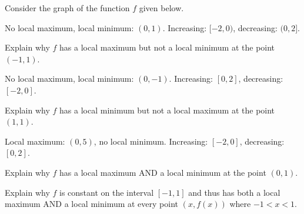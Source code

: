 \documentclass{ximera}
\begin{document}
\begin{problem}
Consider the graph of the function $f$ given below.  

\begin{center}

% 


\end{center}

\begin{solution}
No local maximum,  local minimum: $(0,1)$.  Increasing: $[-2,0)$, decreasing: $(0,2]$.
\end{solution}

\end{problem}

\begin{problem}
Explain why $f$ has a local maximum but not a local minimum at the point $(-1, 1)$.
\begin{solution}
No local maximum,  local minimum: $(0,-1)$.  Increasing: $[0,2]$, decreasing: $[-2,0]$.
\end{solution}

\end{problem}

\begin{problem}
Explain why  $f$ has a local minimum but not a local maximum at the point $(1, 1)$.
\begin{solution}
Local maximum: $(0,5)$, no local minimum.  Increasing: $[-2,0]$, decreasing: $[0,2]$.
\end{solution}

\end{problem}

\begin{problem}
Explain why $f$ has a local maximum AND a local minimum at the point $(0, 1)$.
\end{problem}

\begin{problem}
Explain why $f$ is constant on the interval $[-1, 1]$ and thus has both a local maximum AND a local minimum at every point $(x, f(x))$ where $-1 < x < 1$.
\end{problem}
\end{document}
